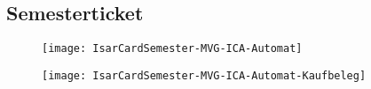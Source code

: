 


\subsection*{Semesterticket}

\begin{figure}[ht]
	\centering
	\begin{minipage}[b]{0.45\linewidth}
		\texttt{[image: IsarCardSemester-MVG-ICA-Automat]}
		\label{fig:isarcardsemestermvg}
	\end{minipage}
	\quad
	\begin{minipage}[b]{0.45\linewidth}
		\texttt{[image: IsarCardSemester-MVG-ICA-Automat-Kaufbeleg]}
		\label{fig:isarcardsemesterbelegmvg}
	\end{minipage}
\end{figure}

